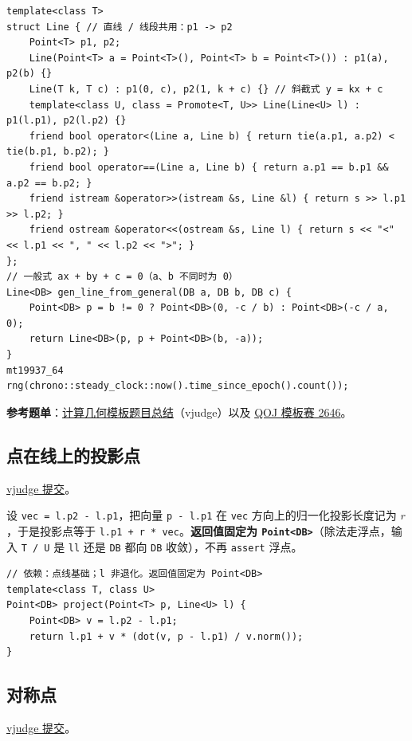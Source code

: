 \begin{verbatim}
template<class T>
struct Line { // 直线 / 线段共用：p1 -> p2
	Point<T> p1, p2;
	Line(Point<T> a = Point<T>(), Point<T> b = Point<T>()) : p1(a), p2(b) {}
	Line(T k, T c) : p1(0, c), p2(1, k + c) {} // 斜截式 y = kx + c
	template<class U, class = Promote<T, U>> Line(Line<U> l) : p1(l.p1), p2(l.p2) {}
	friend bool operator<(Line a, Line b) { return tie(a.p1, a.p2) < tie(b.p1, b.p2); }
	friend bool operator==(Line a, Line b) { return a.p1 == b.p1 && a.p2 == b.p2; }
	friend istream &operator>>(istream &s, Line &l) { return s >> l.p1 >> l.p2; }
	friend ostream &operator<<(ostream &s, Line l) { return s << "<" << l.p1 << ", " << l.p2 << ">"; }
};
// 一般式 ax + by + c = 0（a、b 不同时为 0）
Line<DB> gen_line_from_general(DB a, DB b, DB c) {
	Point<DB> p = b != 0 ? Point<DB>(0, -c / b) : Point<DB>(-c / a, 0);
	return Line<DB>(p, p + Point<DB>(b, -a));
}
mt19937_64 rng(chrono::steady_clock::now().time_since_epoch().count());
\end{verbatim}

		\textbf{参考题单}：\href{https://vjudge.net/article/12247}{计算几何模板题目总结}（vjudge）以及 \href{https://qoj.ac/contest/2646}{QOJ 模板赛 2646}。

		\subsection{点在线上的投影点}

		\href{https://vjudge.net/solution/64166651}{vjudge 提交}。

		设 \texttt{vec = l.p2 - l.p1}，把向量 \texttt{p - l.p1} 在 \texttt{vec} 方向上的归一化投影长度记为 $r$，于是投影点等于 \texttt{l.p1 + r * vec}。\textbf{返回值固定为 \texttt{Point<DB>}}（除法走浮点，输入 \texttt{T / U} 是 \texttt{ll} 还是 \texttt{DB} 都向 \texttt{DB} 收敛），不再 \texttt{assert} 浮点。

\begin{verbatim}
// 依赖：点线基础；l 非退化。返回值固定为 Point<DB>
template<class T, class U>
Point<DB> project(Point<T> p, Line<U> l) {
	Point<DB> v = l.p2 - l.p1;
	return l.p1 + v * (dot(v, p - l.p1) / v.norm());
}
\end{verbatim}

		\subsection{对称点}

		\href{https://vjudge.net/solution/64168723}{vjudge 提交}。

